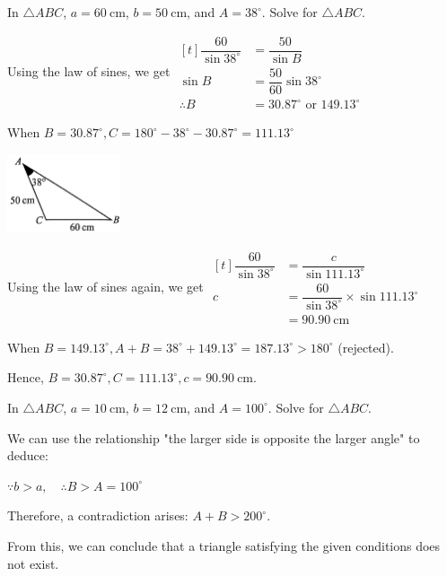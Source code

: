 \documentclass{report}
\begin{document}
\begin{question}
    In $\triangle ABC$, $a=60 \mathrm{~cm}$, $b=50 \mathrm{~cm}$, and $A=38^\circ$. Solve for $\triangle ABC$.

    \sol{}

    \begin{vwcol}[widths={0.6,0.4}, sep=8mm, rule=0pt,justify=flushleft]
        \noindent Using the law of sines, we get $\begin{aligned}[t]
            \dfrac{60}{\sin 38^{\circ}} & =\dfrac{50}{\sin B} \\ \sin B & =\dfrac{50}{60} \sin 38^{\circ} \\ \therefore B & =30.87^{\circ} \text { or } 149.13^{\circ}\end{aligned}$
    
            \vspace{1em}
            \noindent When $B=30.87^{\circ}, C=180^{\circ}-38^{\circ}-30.87^{\circ}=111.13^{\circ}$

        \vspace{3em}
        \includegraphics[width=0.25\textwidth]{assets/10-9.jpg}
    \end{vwcol}

    \vspace{-2em}
        \noindent Using the law of sines again, we get $\begin{aligned}[t] \dfrac{60}{\sin 38^{\circ}} & =\dfrac{c}{\sin 111.13^{\circ}} \\ c & =\dfrac{60}{\sin 38^{\circ}} \times \sin 111.13^{\circ} \\ & =90.90 \mathrm{~cm}\end{aligned}$

        \noindent When $B=149.13^{\circ}, A+B=38^{\circ}+149.13^{\circ}=187.13^{\circ}>180^{\circ}$ (rejected).

        \noindent Hence, $B=30.87^{\circ}, C=111.13^{\circ}, c=90.90 \mathrm{~cm}$.
\end{question}

\begin{question}
    In $\triangle ABC$, $a=10 \mathrm{~cm}$, $b=12 \mathrm{~cm}$, and $A=100^\circ$. Solve for $\triangle ABC$.

    \sol{}

    \noindent We can use the relationship "the larger side is opposite the larger angle" to deduce:

    \vspace{-1em}
\noindent \qquad    $
\because b>a, \quad \therefore B>A=100^\circ
$

\vspace{-1em}
\noindent Therefore, a contradiction arises: $A+B>200^\circ$.

\vspace{-1em}
\noindent From this, we can conclude that a triangle satisfying the given conditions does not exist.
\end{question}
\end{document}
